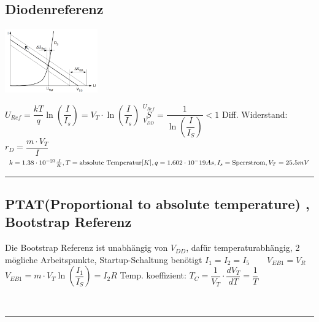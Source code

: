 \subsection{Diodenreferenz}
	\begin{minipage}{100pt}
	
	\end{minipage}
	\begin{minipage}{150pt}
	\includegraphics[width = 4cm]{images/spgref/06_diodenref}
	\end{minipage}
	\begin{minipage}{200pt}
	$U_{Ref} =  \dfrac{kT}{q}\ln\left(\dfrac{I}{I_s}\right) = V_T\cdot \ln\left(\dfrac{I}{I_s}\right)$\newline
	$\underset{V_{DD}}{\overset{U_{Ref}}{S}} = \dfrac{1}{\ln\left(\dfrac{I}{I_S}\right)}<1$\newline
	Diff. Widerstand: $r_D=\dfrac{m\cdot V_T}{I}$
	$k = 1.38\cdot 10^{-23} \frac{J}{K},\newline
	 T = \text{absolute Temperatur} [K], \newline
	 q = 1.602\cdot 10^-{19}As, \newline
	 I_s = \text{Sperrstrom}, \newline
	 V_T = 25.5mV$	\\
	\end{minipage}
\hrule
\subsection{PTAT(Proportional to absolute temperature) , Bootstrap Referenz}
	\begin{minipage}{200pt}
		
	\end{minipage}
	\begin{minipage}{300pt}
	Die Bootstrap Referenz ist unabhängig von $V_{DD}$, dafür temperaturabhängig, 2 mögliche Arbeitspunkte, Startup-Schaltung benötigt\newline
	$I_1 = I_2 = I_5 \qquad V_{EB1} = V_R  $\newline
	$V_{EB1} = m\cdot V_T \ln \left(\dfrac{I_1}{I_S}\right) = I_2 R$\newline
	Temp. koeffizient: $T_C = \dfrac{1}{V_T}\cdot \dfrac{dV_T}{dT} = \dfrac{1}{T}$
	\end{minipage}\\
\hrule
